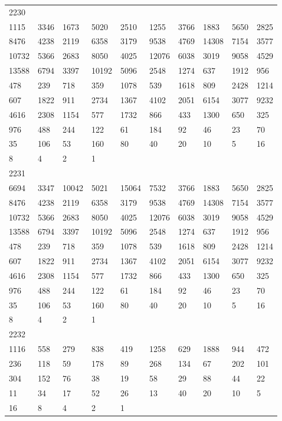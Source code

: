 \begin{longtable}{*{10}{l}}
2230&&&&&&&&&\\
1115& 3346& 1673& 5020& 2510& 1255& 3766& 1883& 5650& 2825\\
8476& 4238& 2119& 6358& 3179& 9538& 4769& 14308& 7154& 3577\\
10732& 5366& 2683& 8050& 4025& 12076& 6038& 3019& 9058& 4529\\
13588& 6794& 3397& 10192& 5096& 2548& 1274& 637& 1912& 956\\
478& 239& 718& 359& 1078& 539& 1618& 809& 2428& 1214\\
607& 1822& 911& 2734& 1367& 4102& 2051& 6154& 3077& 9232\\
4616& 2308& 1154& 577& 1732& 866& 433& 1300& 650& 325\\
976& 488& 244& 122& 61& 184& 92& 46& 23& 70\\
35& 106& 53& 160& 80& 40& 20& 10& 5& 16\\
8& 4& 2& 1& \\

2231&&&&&&&&&\\
6694& 3347& 10042& 5021& 15064& 7532& 3766& 1883& 5650& 2825\\
8476& 4238& 2119& 6358& 3179& 9538& 4769& 14308& 7154& 3577\\
10732& 5366& 2683& 8050& 4025& 12076& 6038& 3019& 9058& 4529\\
13588& 6794& 3397& 10192& 5096& 2548& 1274& 637& 1912& 956\\
478& 239& 718& 359& 1078& 539& 1618& 809& 2428& 1214\\
607& 1822& 911& 2734& 1367& 4102& 2051& 6154& 3077& 9232\\
4616& 2308& 1154& 577& 1732& 866& 433& 1300& 650& 325\\
976& 488& 244& 122& 61& 184& 92& 46& 23& 70\\
35& 106& 53& 160& 80& 40& 20& 10& 5& 16\\
8& 4& 2& 1& \\

2232&&&&&&&&&\\
1116& 558& 279& 838& 419& 1258& 629& 1888& 944& 472\\
236& 118& 59& 178& 89& 268& 134& 67& 202& 101\\
304& 152& 76& 38& 19& 58& 29& 88& 44& 22\\
11& 34& 17& 52& 26& 13& 40& 20& 10& 5\\
16& 8& 4& 2& 1& \\


\end{longtable}
